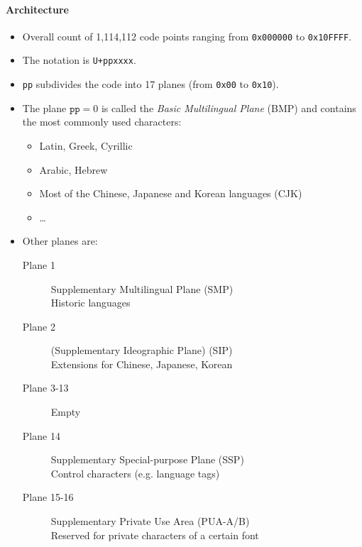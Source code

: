 \documentclass[a4paper, 11pt, accentcolor = tud3b]{tudreport}
\begin{document}
                	\paragraph{Architecture}
                		\begin{itemize}
                			\item Overall count of 1,114,112 code points ranging from \texttt{0x000000} to \texttt{0x10FFFF}.
                			\item The notation is \texttt{U+ppxxxx}.
                			\item \texttt{pp} subdivides the code into 17 planes (from \texttt{0x00} to \texttt{0x10}).
                			\item The plane \( \texttt{pp} = 0 \) is called the \textit{Basic Multilingual Plane} (BMP) and contains the most commonly used characters:
                				\begin{itemize}
                					\item Latin, Greek, Cyrillic
                					\item Arabic, Hebrew
                					\item Most of the Chinese, Japanese and Korean languages (CJK)
                					\item \dots
                				\end{itemize}
                			\item Other planes are:
                				\begin{description}
                					\item[Plane 1] Supplementary Multilingual Plane (SMP) \\ Historic languages
                					\item[Plane 2] (Supplementary Ideographic Plane) (SIP) \\ Extensions for Chinese, Japanese, Korean
                					\item[Plane 3-13] Empty
                					\item[Plane 14] Supplementary Special-purpose Plane (SSP) \\ Control characters (e.g. language tags)
                					\item[Plane 15-16] Supplementary Private Use Area (PUA-A/B) \\ Reserved for private characters of a certain font
                				\end{description}
                		\end{itemize}
\end{document}
